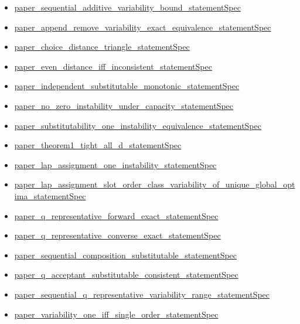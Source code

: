 \documentclass[10pt]{article}
\begin{document}
\begin{itemize}[leftmargin=1.2em]
\begin{itemize}[leftmargin=1.2em]
\item \hyperlink{source-claim-207dcf4700d4343b}{paper\_sequential\_additive\_variability\_bound\_statementSpec}
\item \hyperlink{source-claim-fff538b4a617e0f3}{paper\_append\_remove\_variability\_exact\_equivalence\_statementSpec}
\item \hyperlink{source-claim-e1e0f5f892109672}{paper\_choice\_distance\_triangle\_statementSpec}
\item \hyperlink{source-claim-f8de55f9c5760a87}{paper\_even\_distance\_iff\_inconsistent\_statementSpec}
\item \hyperlink{source-claim-3e732abc6f7366e9}{paper\_independent\_substitutable\_monotonic\_statementSpec}
\item \hyperlink{source-claim-dac748564d615cb6}{paper\_no\_zero\_instability\_under\_capacity\_statementSpec}
\item \hyperlink{source-claim-4efb65f58e4bc480}{paper\_substitutability\_one\_instability\_equivalence\_statementSpec}
\item \hyperlink{source-claim-d2442dd19c06f77a}{paper\_theorem1\_tight\_all\_d\_statementSpec}
\item \hyperlink{source-claim-b3ee09f1e9e6b10d}{paper\_lap\_assignment\_one\_instability\_statementSpec}
\item \hyperlink{source-claim-a0520310d6532be1}{paper\_lap\_assignment\_slot\_order\_class\_variability\_of\_unique\_global\_optima\_statementSpec}
\item \hyperlink{source-claim-a9c5e5d5c616ab58}{paper\_q\_representative\_forward\_exact\_statementSpec}
\item \hyperlink{source-claim-3d12c759820fa6e4}{paper\_q\_representative\_converse\_exact\_statementSpec}
\item \hyperlink{source-claim-5fcefe7f9430bc35}{paper\_sequential\_composition\_substitutable\_statementSpec}
\item \hyperlink{source-claim-b564e283fe9ce18d}{paper\_q\_acceptant\_substitutable\_consistent\_statementSpec}
\item \hyperlink{source-claim-7c749451f4caf111}{paper\_sequential\_q\_representative\_variability\_range\_statementSpec}
\item \hyperlink{source-claim-26bfa3509b616c5d}{paper\_variability\_one\_iff\_single\_order\_statementSpec}
\end{itemize}
\end{itemize}

\clearpage
\hypertarget{library-section-bee5354f1438f98f}{}
\end{document}
